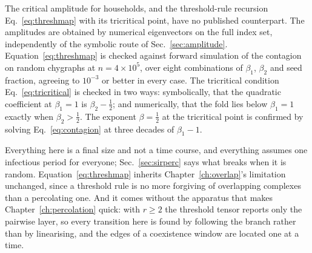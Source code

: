 The critical amplitude for households, and the threshold-rule recursion
Eq.~\eqref{eq:threshmap} with its tricritical point, have no published
counterpart. The amplitudes are obtained by numerical eigenvectors on the full
index set, independently of the symbolic route of Sec.~\ref{sec:amplitude}.
Equation~\eqref{eq:threshmap} is checked against forward simulation of the
contagion on random chygraphs at $n=4\times10^{5}$, over eight combinations of
$\beta_{1}$, $\beta_{2}$ and seed fraction, agreeing to $10^{-3}$ or better in
every case. The tricritical condition Eq.~\eqref{eq:tricritical} is checked in
two ways: symbolically, that the quadratic coefficient at $\beta_{1}=1$ is
$\beta_{2}-\tfrac12$; and numerically, that the fold lies below $\beta_{1}=1$
exactly when $\beta_{2}>\tfrac12$. The exponent $\beta=\tfrac12$ at the
tricritical point is confirmed by solving Eq.~\eqref{eq:contagion} at three
decades of $\beta_{1}-1$.

Everything here is a final size and not a time course, and everything assumes
one infectious period for everyone; Sec.~\ref{sec:sirperc} says what breaks when
it is random. Equation~\eqref{eq:threshmap} inherits Chapter~\ref{ch:overlap}'s
limitation unchanged, since a threshold rule is no more forgiving of overlapping
complexes than a percolating one. And it comes without the apparatus that makes
Chapter~\ref{ch:percolation} quick: with $r\ge2$ the threshold tensor reports
only the pairwise layer, so every transition here is found by following the
branch rather than by linearising, and the edges of a coexistence window are
located one at a time.

